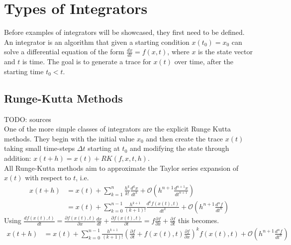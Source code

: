 \section{Types of Integrators}
Before examples of integrators will be showcased, they first need to be defined.
An integrator is an algorithm that given a starting condition $x(t_0) = x_0$ can solve a differential equation of the form $\frac{dx}{dt} = f(x,t)$, where $x$ is the state vector and $t$ is time.
The goal is to generate a trace for $x(t)$ over time, after the starting time $t_0<t$.

\subsection{Runge-Kutta Methods}
TODO: sources\\
One of the more simple classes of integrators are the explicit Runge Kutta methods.
They begin with the initial value $x_0$ and then create the trace $x(t)$ taking small time-steps $\Delta t$ starting at $t_0$ and modifying the state through addition: $x(t+h) = x(t) + RK(f,x,t,h)$.\\
All Runge-Kutta methods aim to approximate the Taylor series expansion of $x(t)$ with respect to $t$, i.e.
\begin{align*}
x(t+h) &= x(t) + \sum_{k=1}^{n}\frac{h^k}{k!}\frac{d^kx}{dt^k} + \mathcal{O} (h^{n+1}\frac{d^{n+1}x}{dt^{n+1}})\\
&= x(t)+ \sum_{k=0}^{n-1}\frac{h^{k+1}}{(k+1)!}\frac{d^kf(x(t),t)}{dt^k} + \mathcal{O}(h^{n+1}\frac{d^{n}f}{dt^{n}})
\end{align*}
Using $\frac{df(x(t),t)}{dt} 
= \frac{\partial f(x(t),t)}{\partial x}\frac{dx}{dt}+\frac{\partial f(x(t),t)}{\partial t} 
= f\frac{\partial f}{\partial x}+\frac{\partial f}{\partial t}$
this becomes.
\begin{align*}
x(t+h) &= x(t)+ \sum_{k=0}^{n-1}\frac{h^{k+1}}{(k+1)!}(\frac{\partial f}{\partial t} + f(x(t),t)\frac{\partial f}{\partial x})^kf(x(t),t) + \mathcal{O}(h^{n+1}\frac{d^{n}f}{dt^{n}})
\end{align*}



